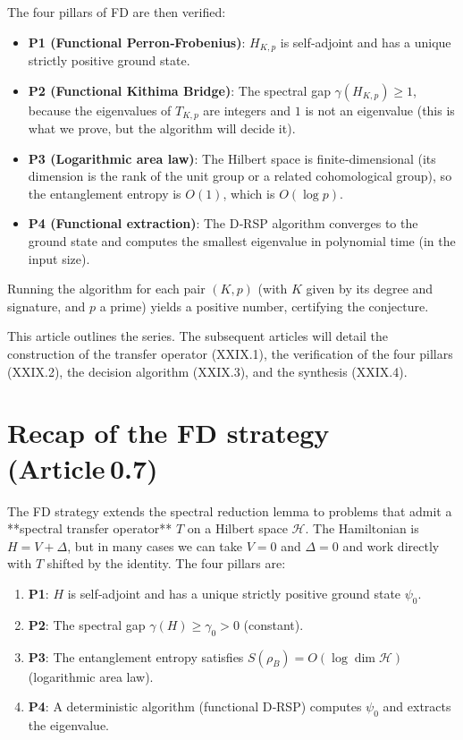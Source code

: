 \documentclass[11pt,a4paper]{article}
\begin{document}
The four pillars of FD are then verified:
\begin{itemize}
\item \textbf{P1 (Functional Perron‑Frobenius)}: $H_{K,p}$ is self‑adjoint and has a unique strictly positive ground state.
\item \textbf{P2 (Functional Kithima Bridge)}: The spectral gap $\gamma(H_{K,p}) \ge 1$, because the eigenvalues of $T_{K,p}$ are integers and $1$ is not an eigenvalue (this is what we prove, but the algorithm will decide it).
\item \textbf{P3 (Logarithmic area law)}: The Hilbert space is finite‑dimensional (its dimension is the rank of the unit group or a related cohomological group), so the entanglement entropy is $O(1)$, which is $O(\log p)$.
\item \textbf{P4 (Functional extraction)}: The D‑RSP algorithm converges to the ground state and computes the smallest eigenvalue in polynomial time (in the input size).
\end{itemize}

Running the algorithm for each pair $(K,p)$ (with $K$ given by its degree and signature, and $p$ a prime) yields a positive number, certifying the conjecture.

This article outlines the series. The subsequent articles will detail the construction of the transfer operator (XXIX.1), the verification of the four pillars (XXIX.2), the decision algorithm (XXIX.3), and the synthesis (XXIX.4).

\section{Recap of the FD strategy (Article 0.7)}

The FD strategy extends the spectral reduction lemma to problems that admit a **spectral transfer operator** $T$ on a Hilbert space $\mathcal{H}$. The Hamiltonian is $H = V + \Delta$, but in many cases we can take $V=0$ and $\Delta=0$ and work directly with $T$ shifted by the identity. The four pillars are:

\begin{enumerate}
\item \textbf{P1}: $H$ is self‑adjoint and has a unique strictly positive ground state $\psi_0$.
\item \textbf{P2}: The spectral gap $\gamma(H) \ge \gamma_0 > 0$ (constant).
\item \textbf{P3}: The entanglement entropy satisfies $S(\rho_B) = O(\log \dim \mathcal{H})$ (logarithmic area law).
\item \textbf{P4}: A deterministic algorithm (functional D‑RSP) computes $\psi_0$ and extracts the eigenvalue.
\end{enumerate}
\end{document}
